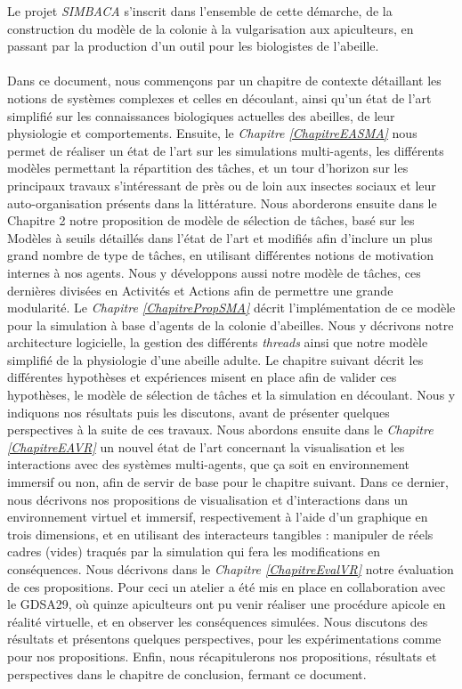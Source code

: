 	Le projet \textit{SIMBACA} s'inscrit dans l'ensemble de cette démarche, de la construction du modèle de la colonie à la vulgarisation aux apiculteurs, en passant par la production d'un outil pour les biologistes de l'abeille.
	
	\paragraph{}
	Dans ce document, nous commençons par un chapitre de contexte détaillant les notions de systèmes complexes et celles en découlant, ainsi qu'un état de l'art simplifié sur les connaissances biologiques actuelles des abeilles, de leur physiologie et comportements.
	 Ensuite, le \textit{Chapitre \ref{ChapitreEASMA}} nous permet de réaliser un état de l'art sur les simulations multi-agents, les différents modèles permettant la répartition des tâches, et un tour d'horizon sur les principaux travaux s'intéressant de près ou de loin aux insectes sociaux et leur auto-organisation présents dans la littérature. 
	 Nous aborderons ensuite dans le Chapitre 2 notre proposition de modèle de sélection de tâches, basé sur les Modèles à seuils détaillés dans l'état de l'art et modifiés afin d'inclure un plus grand nombre de type de tâches, en utilisant différentes notions de motivation internes à nos agents. Nous y développons aussi notre modèle de tâches, ces dernières divisées en Activités et Actions afin de permettre une grande modularité. 
	 Le \textit{Chapitre \ref{ChapitrePropSMA}} décrit l'implémentation de ce modèle pour la simulation à base d'agents de la colonie d'abeilles. Nous y décrivons notre architecture logicielle, la gestion des différents \textit{threads} ainsi que notre modèle simplifié de la physiologie d'une abeille adulte. 
	 Le chapitre suivant décrit les différentes hypothèses et expériences misent en place afin de valider ces hypothèses, le modèle de sélection de tâches et la simulation en découlant. Nous y indiquons nos résultats puis les discutons, avant de présenter quelques perspectives à la suite de ces travaux. 
	 Nous abordons ensuite dans le \textit{Chapitre \ref{ChapitreEAVR}} un nouvel état de l'art concernant la visualisation et les interactions avec des systèmes multi-agents, que ça soit en environnement immersif ou non, afin de servir de base pour le chapitre suivant. 
	 Dans ce dernier, nous décrivons nos propositions de visualisation et d'interactions dans un environnement virtuel et immersif, respectivement à l'aide d'un graphique en trois dimensions, et en utilisant des interacteurs tangibles : manipuler de réels cadres (vides) traqués par la simulation qui fera les modifications en conséquences. 
	 Nous décrivons dans le \textit{Chapitre \ref{ChapitreEvalVR}} notre évaluation de ces propositions. Pour ceci un atelier a été mis en place en collaboration avec le GDSA29, où quinze apiculteurs ont pu venir réaliser une procédure apicole en réalité virtuelle, et en observer les conséquences simulées. Nous discutons des résultats et présentons quelques perspectives, pour les expérimentations comme pour nos propositions. 
	 Enfin, nous récapitulerons nos propositions, résultats et perspectives dans le chapitre de conclusion, fermant ce document.